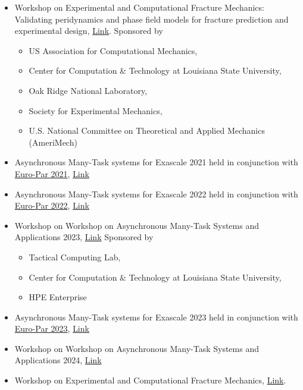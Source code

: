 \documentclass[11pt,a4paper,sans]{moderncv}
\begin{document}
\begin{itemize}[leftmargin=4cm]
\item Workshop on Experimental and Computational Fracture Mechanics:  Validating peridynamics and phase field models for fracture
prediction and experimental design, \href{http://wfm2020.usacm.org/}{Link}. Sponsored by
\begin{itemize}
\item US Association for Computational Mechanics,
\item Center for Computation \& Technology at Louisiana State University, 
\item Oak Ridge National Laboratory,
\item Society for Experimental Mechanics,
\item U.S. National Committee on Theoretical and Applied Mechanics (AmeriMech)
\end{itemize}
\item Asynchronous Many-Task systems for Exascale 2021 held in conjunction with \href{https://2021.euro-par.org/}{Euro-Par 2021},  \href{https://amte2021.stellar-group.org}{Link}
\item Asynchronous Many-Task systems for Exascale 2022 held in conjunction with \href{https://2022.euro-par.org/}{Euro-Par 2022},  \href{https://amte2022.stellar-group.org}{Link}
\item Workshop on Workshop on Asynchronous Many-Task Systems and Applications 2023,  \href{https://wamta23.stellar-group.org/}{Link} Sponsored by
\begin{itemize}
\item Tactical Computing Lab,
\item Center for Computation \& Technology at Louisiana State University,
\item HPE Enterprise 
\end{itemize}
\item Asynchronous Many-Task systems for Exascale 2023 held in conjunction with \href{https://2023.euro-par.org/}{Euro-Par 2023},  \href{https://amte2023.stellar-group.org}{Link}
\item Workshop on Workshop on Asynchronous Many-Task Systems and Applications 2024,  \href{http://wamta24.icl.utk.edu/}{Link}
\item Workshop on Experimental and Computational Fracture Mechanics, \href{http://wfm2024.usacm.org/}{Link}.
\end{itemize}
\end{document}
